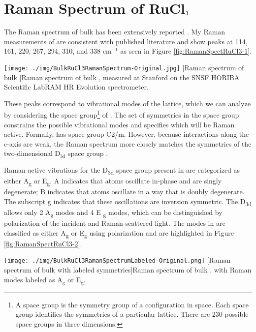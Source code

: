 \section{Raman Spectrum of \texorpdfstring{RuCl$\textsubscript{3}$}{RuCl3}}

The Raman spectrum of bulk \rucl has been extensively reported  \cite{Sandilands2015,Sandilands2016,Glamazda2017,Mashhadi2018,Zhou2018}. My Raman measurements of \rucl are consistent with published literature and show peaks at 114, 161, 220, 267, 294, 310, and 338 cm$^{-1}$ as seen in Figure \ref{fig:RamanSpectRuCl3-1}.

\begin{centering}
\texttt{[image: ./img/BulkRuCl3RamanSpectrum-Original.jpg]}
  \captionsetup{width=0.75\textwidth}
  [Raman spectrum of bulk \ruclnospace]{Raman spectrum of bulk \ruclnospace, measured at Stanford on the SNSF HORIBA Scientific LabRAM HR Evolution spectrometer.}
  \label{fig:RamanSpectRuCl3-1}
\end{centering}

These peaks correspond to vibrational modes of the lattice, which we can analyze by considering the space group\footnote{A space group is the symmetry group of a configuration in space. Each space group identifies the symmetries of a particular lattice. There are 230 possible space groups in three dimensions.} of \ruclnospace. The set of symmetries in the space group constrains the possible vibrational modes and specifies which will be Raman active. Formally, \rucl has space group C2/m. However, because interactions along the c-axis are weak, the Raman spectrum more closely matches the symmetries of the two-dimensional D$_{\text{3d}}$ space group \cite{Sandilands2015}.

Raman-active vibrations for the D\textsubscript{3d} space group present in \rucl are categorized as either A\textsubscript{g} or E\textsubscript{g}. A indicates that atoms oscillate in-phase and are singly degenerate; B indicates that atoms oscillate in a way that is doubly degenerate. The subscript g indicates that these oscillations are inversion symmetric. The D\textsubscript{3d} allows only 2 A\textsubscript{g} modes and 4 E \textsubscript{g} modes, which can be distinguished by polarization of the incident and Raman-scattered light. The modes in \rucl are classified as either A\textsubscript{g} or E\textsubscript{g} using polarization and are  highlighted in Figure \ref{fig:RamanSpectRuCl3-2}.

\begin{centering}
\texttt{[image: ./img/BulkRuCl3RamanSpectrumLabeled-Original.png]}
  \captionsetup{width=0.75\textwidth}
  [Raman spectrum of bulk \ruclnospace with labeled symmetries]{Raman spectrum of bulk \ruclnospace, with Raman modes labeled as A\textsubscript{g} or E\textsubscript{g}.}
  \label{fig:RamanSpectRuCl3-2}
\end{centering}


